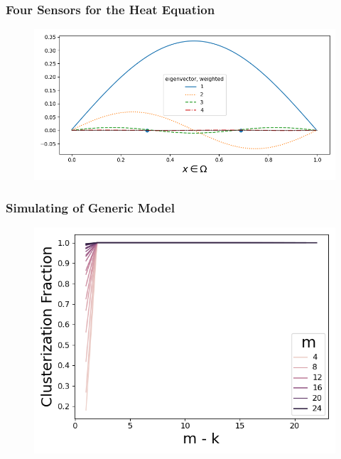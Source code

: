 \documentclass{beamer}
\begin{document}
\begin{frame}
  \frametitle{Four Sensors for the Heat Equation}
  \begin{figure}
    \centering
    \includegraphics[width=\textwidth]{figs/eigenvectors.png}
  \end{figure}
\end{frame}

\begin{frame}
  \frametitle{Simulating of Generic Model}
  \begin{figure}
    \centering
    \includegraphics[width=\textwidth]{figs/simulations.png}
  \end{figure}
\end{frame}
\end{document}
